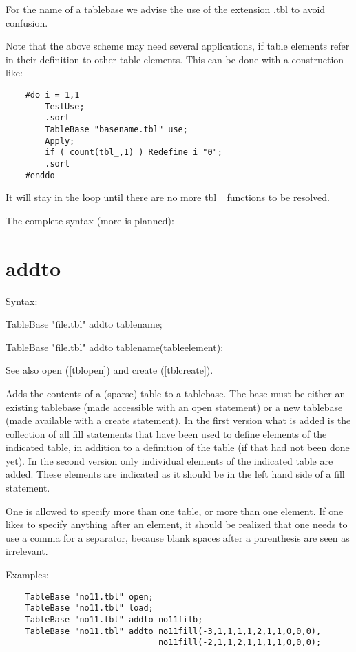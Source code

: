 For the name of a tablebase we advise the use of the extension 
.tbl to avoid confusion.

Note that the above scheme may need several applications, if table elements 
refer in their definition to other table elements. This can be done with a 
construction like:
\begin{verbatim}
    #do i = 1,1
        TestUse;
        .sort
        TableBase "basename.tbl" use;
        Apply;
        if ( count(tbl_,1) ) Redefine i "0";
        .sort
    #enddo
\end{verbatim}
It will stay in the loop until there are no more tbl\_ functions to be 
resolved.

\medskip\noindent The complete syntax (more is planned):


\section{addto}
\label{tbladdto}

\noindent Syntax:

TableBase "file.tbl" addto tablename;

TableBase "file.tbl" addto tablename(tableelement);

\noindent See also open (\ref{tblopen}) and create (\ref{tblcreate}).

\noindent Adds the contents of a (sparse) table 
to a tablebase. The base must be either an existing tablebase (made 
accessible with an open statement) or a new tablebase (made available with 
a create statement). In the first version what is added is the collection 
of all fill statements that have been used to define elements of the 
indicated table, in addition to a definition of the table (if that had not 
been done yet). In the second version only individual elements of the 
indicated table are added. These elements are indicated as it should be in 
the left hand side of a fill statement.

\noindent One is allowed to specify more than one table, or more than one 
element. If one likes to specify anything after an element, it should be 
realized that one needs to use a comma for a separator, because blank 
spaces after a parenthesis are seen as irrelevant.

\noindent Examples:
\begin{verbatim}
    TableBase "no11.tbl" open;
    TableBase "no11.tbl" load;
    TableBase "no11.tbl" addto no11filb;
    TableBase "no11.tbl" addto no11fill(-3,1,1,1,1,2,1,1,0,0,0),
                               no11fill(-2,1,1,2,1,1,1,1,0,0,0);
\end{verbatim}

